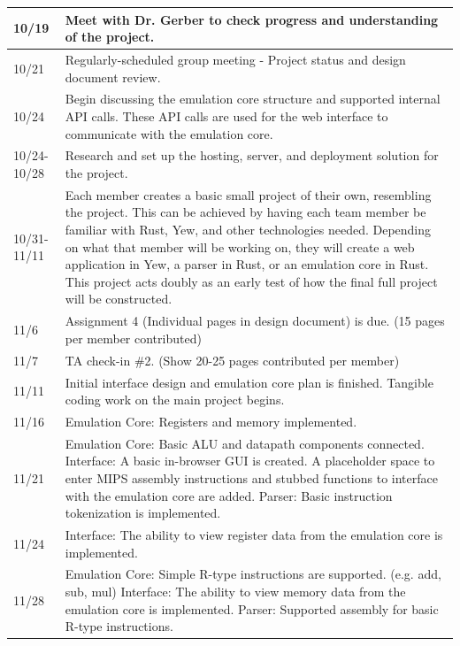 \documentclass[
    paper=letter,
    parskip=half,
    fontsize=12pt,
    titlepage=firstiscover,
    toc=bibliography,
    numbers=endperiod
]{scrartcl}
\begin{document}
{\begin{tabularx}{\textwidth}{|l|X|}
        10/19         & Meet with Dr. Gerber to check progress and understanding of the project. \\\hline
        10/21         & Regularly-scheduled group meeting - Project status and design document review. \\\hline
        10/24         & Begin discussing the emulation core structure and supported internal API calls. These API calls are used for the web interface to communicate with the emulation core. \\\hline
        10/24-10/28   & Research and set up the hosting, server, and deployment solution for the project. \\\hline
        10/31-11/11   & Each member creates a basic small project of their own, resembling the project. This can be achieved by having each team member be familiar with Rust, Yew, and other technologies needed. Depending on what that member will be working on, they will create a web application in Yew, a parser in Rust, or an emulation core in Rust. This project acts doubly as an early test of how the final full project will be constructed. \\\hline
        11/6          & Assignment 4 (Individual pages in design document) is due. (15 pages per member contributed) \\\hline
        11/7          & TA check-in \#2. (Show 20-25 pages contributed per member) \\\hline
        11/11         & Initial interface design and emulation core plan is finished. Tangible coding work on the main project begins. \\\hline
        11/16         & Emulation Core: Registers and memory implemented. \\\hline
        11/21         & Emulation Core: Basic ALU and datapath components connected. \newline Interface: A basic in-browser GUI is created. A placeholder space to enter MIPS assembly instructions and stubbed functions to interface with the emulation core are added. \newline Parser: Basic instruction tokenization is implemented. \\\hline
        11/24         & Interface: The ability to view register data from the emulation core is implemented. \\\hline
        11/28         & Emulation Core: Simple R-type instructions are supported. (e.g. add, sub, mul) \newline Interface: The ability to view memory data from the emulation core is implemented. \newline Parser: Supported assembly for basic R-type instructions. \\\hline

\end{tabularx}}
\end{document}
